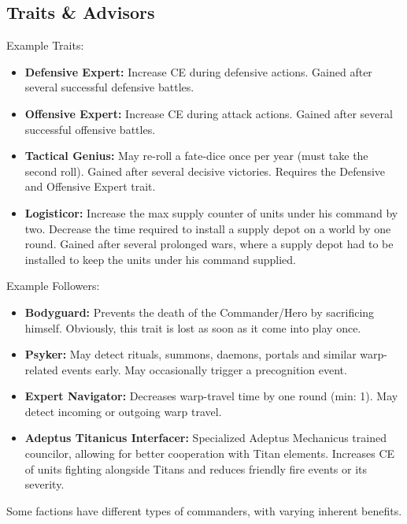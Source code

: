  \subsection{Traits \& Advisors}
 Example Traits:
 \begin{itemize}
     \item \textbf{Defensive Expert:} Increase CE during defensive actions. Gained after several successful defensive battles.
     \item \textbf{Offensive Expert:} Increase CE during attack actions. Gained after several successful offensive battles.
     \item \textbf{Tactical Genius:} May re-roll a fate-dice once per year (must take the second roll). Gained after several decisive victories. Requires the Defensive and Offensive Expert trait.
     \item \textbf{Logisticor:} Increase the max supply counter of units under his command by two. Decrease the time required to install a supply depot on a world by one round. Gained after several prolonged wars, where a supply depot had to be installed to keep the units under his command supplied.
 \end{itemize}
 Example Followers:
 \begin{itemize}
    \item \textbf{Bodyguard:} Prevents the death of the Commander/Hero by sacrificing himself. Obviously, this trait is lost as soon as it come into play once.
     \item \textbf{Psyker:} May detect rituals, summons, daemons, portals and similar warp-related events early. May occasionally trigger a precognition event.
     \item \textbf{Expert Navigator:} Decreases warp-travel time by one round (min: 1). May detect incoming or outgoing warp travel.
     \item \textbf{Adeptus Titanicus Interfacer:} Specialized Adeptus Mechanicus trained councilor, allowing for better cooperation with Titan elements. Increases CE of units fighting alongside Titans and reduces friendly fire events or its severity.
 \end{itemize}
Some factions have different types of commanders, with varying inherent benefits.